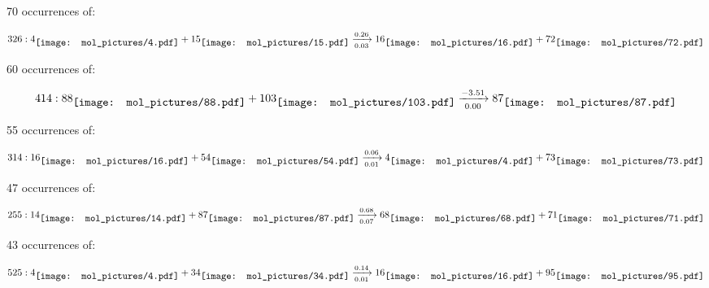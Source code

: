 \documentclass{article}
\begin{document}
\vspace{1cm}


70 occurrences of:

$$
326:  
4
\raisebox{-.5\height}{\texttt{[image: mol\_pictures/4.pdf]}}
+
15
\raisebox{-.5\height}{\texttt{[image: mol\_pictures/15.pdf]}}
\xrightarrow[0.03]{0.26}
16
\raisebox{-.5\height}{\texttt{[image: mol\_pictures/16.pdf]}}
+
72
\raisebox{-.5\height}{\texttt{[image: mol\_pictures/72.pdf]}}
$$



\vspace{1cm}


60 occurrences of:

$$
414:  
88
\raisebox{-.5\height}{\texttt{[image: mol\_pictures/88.pdf]}}
+
103
\raisebox{-.5\height}{\texttt{[image: mol\_pictures/103.pdf]}}
\xrightarrow[0.00]{-3.51}
87
\raisebox{-.5\height}{\texttt{[image: mol\_pictures/87.pdf]}}
$$



\vspace{1cm}


55 occurrences of:

$$
314:  
16
\raisebox{-.5\height}{\texttt{[image: mol\_pictures/16.pdf]}}
+
54
\raisebox{-.5\height}{\texttt{[image: mol\_pictures/54.pdf]}}
\xrightarrow[0.01]{0.06}
4
\raisebox{-.5\height}{\texttt{[image: mol\_pictures/4.pdf]}}
+
73
\raisebox{-.5\height}{\texttt{[image: mol\_pictures/73.pdf]}}
$$



\vspace{1cm}


47 occurrences of:

$$
255:  
14
\raisebox{-.5\height}{\texttt{[image: mol\_pictures/14.pdf]}}
+
87
\raisebox{-.5\height}{\texttt{[image: mol\_pictures/87.pdf]}}
\xrightarrow[0.07]{0.68}
68
\raisebox{-.5\height}{\texttt{[image: mol\_pictures/68.pdf]}}
+
71
\raisebox{-.5\height}{\texttt{[image: mol\_pictures/71.pdf]}}
$$



\vspace{1cm}


43 occurrences of:

$$
525:  
4
\raisebox{-.5\height}{\texttt{[image: mol\_pictures/4.pdf]}}
+
34
\raisebox{-.5\height}{\texttt{[image: mol\_pictures/34.pdf]}}
\xrightarrow[0.01]{0.14}
16
\raisebox{-.5\height}{\texttt{[image: mol\_pictures/16.pdf]}}
+
95
\raisebox{-.5\height}{\texttt{[image: mol\_pictures/95.pdf]}}
$$
\end{document}
